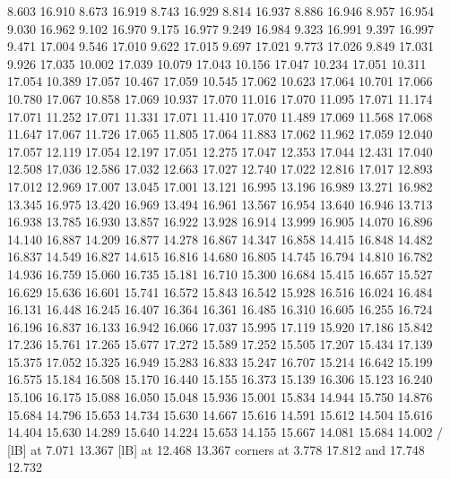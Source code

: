 {         8.603 16.910
         8.673 16.919
         8.743 16.929
         8.814 16.937
         8.886 16.946
         8.957 16.954
         9.030 16.962
         9.102 16.970
         9.175 16.977
         9.249 16.984
         9.323 16.991
         9.397 16.997
         9.471 17.004
         9.546 17.010
         9.622 17.015
         9.697 17.021
         9.773 17.026
         9.849 17.031
         9.926 17.035
        10.002 17.039
        10.079 17.043
        10.156 17.047
        10.234 17.051
        10.311 17.054
        10.389 17.057
        10.467 17.059
        10.545 17.062
        10.623 17.064
        10.701 17.066
        10.780 17.067
        10.858 17.069
        10.937 17.070
        11.016 17.070
        11.095 17.071
        11.174 17.071
        11.252 17.071
        11.331 17.071
        11.410 17.070
        11.489 17.069
        11.568 17.068
        11.647 17.067
        11.726 17.065
        11.805 17.064
        11.883 17.062
        11.962 17.059
        12.040 17.057
        12.119 17.054
        12.197 17.051
        12.275 17.047
        12.353 17.044
        12.431 17.040
        12.508 17.036
        12.586 17.032
        12.663 17.027
        12.740 17.022
        12.816 17.017
        12.893 17.012
        12.969 17.007
        13.045 17.001
        13.121 16.995
        13.196 16.989
        13.271 16.982
        13.345 16.975
        13.420 16.969
        13.494 16.961
        13.567 16.954
        13.640 16.946
        13.713 16.938
        13.785 16.930
        13.857 16.922
        13.928 16.914
        13.999 16.905
        14.070 16.896
        14.140 16.887
        14.209 16.877
        14.278 16.867
        14.347 16.858
        14.415 16.848
        14.482 16.837
        14.549 16.827
        14.615 16.816
        14.680 16.805
        14.745 16.794
        14.810 16.782
        14.936 16.759
        15.060 16.735
        15.181 16.710
        15.300 16.684
        15.415 16.657
        15.527 16.629
        15.636 16.601
        15.741 16.572
        15.843 16.542
        15.928 16.516
        16.024 16.484
        16.131 16.448
        16.245 16.407
        16.364 16.361
        16.485 16.310
        16.605 16.255
        16.724 16.196
        16.837 16.133
        16.942 16.066
        17.037 15.995
        17.119 15.920
        17.186 15.842
        17.236 15.761
        17.265 15.677
        17.272 15.589
        17.252 15.505
        17.207 15.434
        17.139 15.375
        17.052 15.325
        16.949 15.283
        16.833 15.247
        16.707 15.214
        16.642 15.199
        16.575 15.184
        16.508 15.170
        16.440 15.155
        16.373 15.139
        16.306 15.123
        16.240 15.106
        16.175 15.088
        16.050 15.048
        15.936 15.001
        15.834 14.944
        15.750 14.876
        15.684 14.796
        15.653 14.734
        15.630 14.667
        15.616 14.591
        15.612 14.504
        15.616 14.404
        15.630 14.289
        15.640 14.224
        15.653 14.155
        15.667 14.081
        15.684 14.002
        /
%
%
 [lB] at  7.071 13.367
%
%
 [lB] at 12.468 13.367
\linethickness=0pt
\putrectangle corners at  3.778 17.812 and 17.748 12.732
\endpicture}
